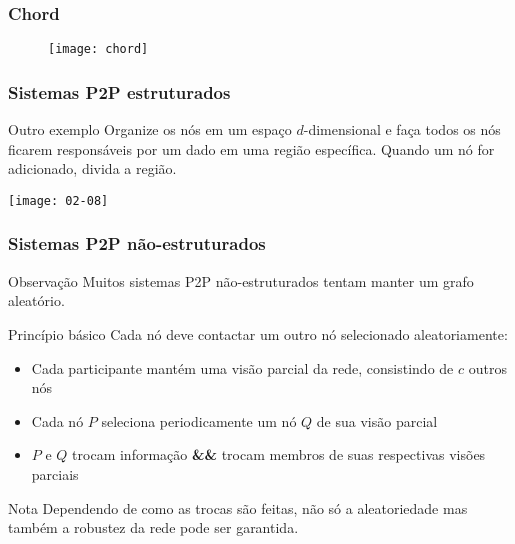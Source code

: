 \documentclass[Ligatures=TeX,table,brazil,svgnames,usetotalslideindicator,compress,10pt]{beamer}
\begin{document}
\begin{frame}
  \frametitle{Chord}
  \begin{figure}
      \centering
      \texttt{[image: chord]}
    \end{figure}
\end{frame}

\begin{frame}
  \frametitle{Sistemas P2P estruturados}

  \begin{exampleblock}{Outro exemplo}
    Organize os nós em um espaço $d$-dimensional e faça todos os nós ficarem responsáveis por um dado em uma região específica. Quando um nó for adicionado, divida a região.
  \end{exampleblock}

  \begin{center}
    \texttt{[image: 02-08]}
  \end{center}

\end{frame}


\begin{frame}
  \frametitle{Sistemas P2P não-estruturados}
  \begin{block}{Observação}
    Muitos sistemas P2P não-estruturados tentam manter um \alert{grafo aleatório}.
  \end{block}

  \begin{block}{Princípio básico}
    Cada nó deve contactar um outro nó selecionado aleatoriamente:

    \begin{itemize}
    \item Cada participante mantém uma \alert{visão parcial} da rede, consistindo de $c$ outros nós
    \item Cada nó $P$ seleciona periodicamente um nó $Q$ de sua visão parcial
    \item $P$ e $Q$ trocam informação \textbf{\&\&} trocam membros de suas respectivas visões parciais
    \end{itemize}
  \end{block}

  \vspace{-1em}
  \begin{alertblock}{Nota}
    Dependendo de como as trocas são feitas, não só a aleatoriedade
    mas também a \alert{robustez} da rede pode ser garantida.
  \end{alertblock}

\end{frame}
\end{document}
